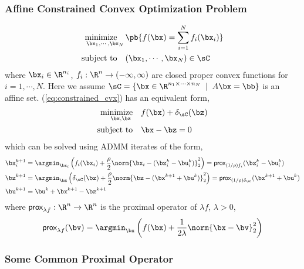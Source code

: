 \documentclass[../writeup.tex]{subfiles}
\begin{document}
\subsubsection{Affine Constrained Convex Optimization Problem}
\begin{equation}
    \begin{aligned}
        \underset{\bx_1,\cdots,\bx_N}{\minimize}
            &\pb{f(\bx) = \sum_{i=1}^N f_i(\bx_i)} \\
        \subjectto
            & (\bx_1,\cdots,\bx_N) \in \sC \\
    \end{aligned}
    \label{eq:constrained_cvx}
\end{equation}
where $\bx_i\in\R^{n_i}$, $f_i: \R^{n} \to (-\infty,\infty)$ are closed proper convex functions for $i=1,\cdots,N$. Here we assume $\sC = \{ \bx \in\R^{n_1\times \cdots\times n_N} \;\mid\; A \bx = \bb \}$ is an affine set. (\ref{eq:constrained_cvx}) has an equivalent form,
\begin{equation}
    \begin{aligned}
        \underset{\bx,\bz}{\minimize}  & f(\bx) + \delta_{\sC}(\bz) \\
        \subjectto & \bx - \bz = 0 \\
    \end{aligned}
    \label{eq:constrained_cvx_indicator_set}
\end{equation}
which can be solved using ADMM iterates of the form,
\begin{align*}
    \bx_i^{k+1} 
        &= \argmin_{\bx_i} \left( f_i(\bx_i) + \frac{\rho}{2} \norm{\bx_i - (\bz_i^k - \bu_i^k)}_2^2 \right) 
        = \prox_{(1/\rho)f_i}(\bz_i^k - \bu_i^k) \\
    \bz^{k+1}
        &= \argmin_{\bz} \left( \delta_{\sC}(\bz) + \frac{\rho}{2} \norm{ \bz - (\bx^{k+1} + \bu^k) }_2^2 \right)
        = \prox_{(1/\rho)\delta_{\sC}}(\bx^{k+1} + \bu^k) \\
    \bu^{k+1} 
        &= \bu^k + \bx^{k+1} - \bz^{k+1}
\end{align*}
where $\prox_{\lambda f}: \R^n \to \R^n$ is the proximal operator of $\lambda f$, $\lambda >0$, 
\[
    \prox_{\lambda f}(\bv) = \argmin_{\bx} \left( f(\bx) + \frac{1}{2\lambda} \norm{\bx-\bv}_2^2 \right)    
\]

\subsubsection{Some Common Proximal Operator}
\end{document}
